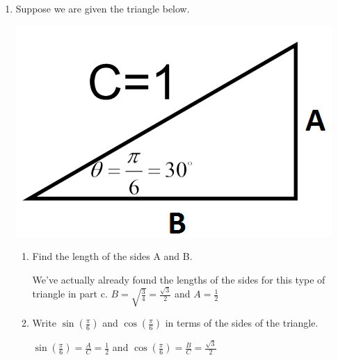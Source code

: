 \documentclass[nooutcomes,handout]{ximera}
\begin{document}
\begin{problem}
\begin{enumerate}
\begin{enumerate}
\begin{freeResponse}
	\end{freeResponse}
	\end{enumerate}

\item Suppose we are given the triangle below.  
		\begin{image}
		\includegraphics[scale=.5]{figure5.png}
		\end{image}

		\begin{enumerate}
	\item Find the length of the sides A and B.
	\begin{freeResponse}
	We've actually already found the lengths of the sides for this type of triangle in part c.  $B=\sqrt{\frac{3}{4}}=\frac{\sqrt{3}}{2}$ and $A=\frac{1}{2}$ 
	\end{freeResponse}

	\item Write $\sin\left(\frac{\pi}{6}\right)$ and $\cos\left(\frac{\pi}{6}\right)$ in terms of the sides of the triangle.

	\begin{freeResponse}
	$\sin\left(\frac{\pi}{6}\right)=\frac{A}{C}=\frac{1}{2}$ and $\cos\left(\frac{\pi}{6}\right)=\frac{B}{C}=\frac{\sqrt{3}}{2}$

	\end{freeResponse}
	\end{enumerate}




\end{enumerate}
\end{problem}
\end{document}
